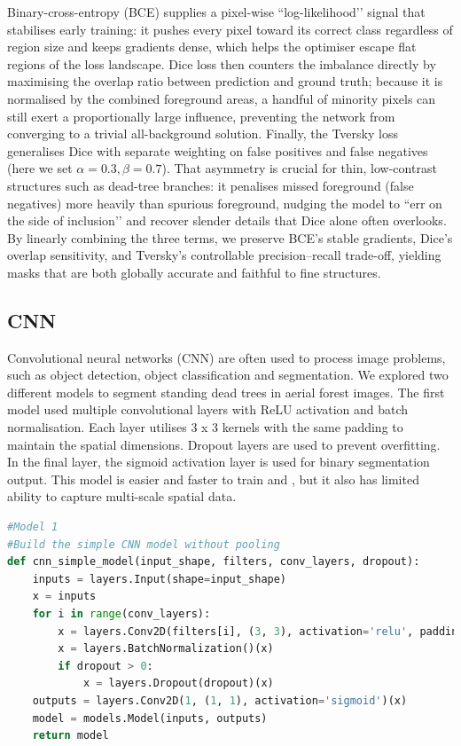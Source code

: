 Binary-cross-entropy (BCE) supplies a pixel-wise “log-likelihood’’ signal that stabilises early training: it pushes every pixel toward its correct class regardless of region size and keeps gradients dense, which helps the optimiser escape flat regions of the loss landscape. Dice loss then counters the imbalance directly by maximising the overlap ratio between prediction and ground truth; because it is normalised by the combined foreground areas, a handful of minority pixels can still exert a proportionally large influence, preventing the network from converging to a trivial all-background solution. Finally, the Tversky loss generalises Dice with separate weighting on false positives and false negatives (here we set \begin{math}\alpha = 0.3, \beta = 0.7\end{math}). That asymmetry is crucial for thin, low-contrast structures such as dead-tree branches: it penalises missed foreground (false negatives) more heavily than spurious foreground, nudging the model to “err on the side of inclusion’’ and recover slender details that Dice alone often overlooks. By linearly combining the three terms, we preserve BCE’s stable gradients, Dice’s overlap sensitivity, and Tversky’s controllable precision–recall trade-off, yielding masks that are both globally accurate and faithful to fine structures.
\subsection{CNN}
Convolutional neural networks (CNN) are often used to process image problems, such as object detection, object classification and segmentation\cite{b8}. We explored two different models to segment standing dead trees in aerial forest images. The first model used multiple convolutional layers with ReLU activation and batch normalisation. Each layer utilises 3 x 3 kernels with the same padding to maintain the spatial dimensions. Dropout layers are used to prevent overfitting. In the final layer, the sigmoid activation layer is used for binary segmentation output. This model is easier and faster to train and , but it also has limited ability to capture multi-scale spatial data. 

\begin{lstlisting}[language=Python]
#Model 1
#Build the simple CNN model without pooling
def cnn_simple_model(input_shape, filters, conv_layers, dropout):
    inputs = layers.Input(shape=input_shape)
    x = inputs
    for i in range(conv_layers):
        x = layers.Conv2D(filters[i], (3, 3), activation='relu', padding='same')(x)
        x = layers.BatchNormalization()(x)
        if dropout > 0:
            x = layers.Dropout(dropout)(x)
    outputs = layers.Conv2D(1, (1, 1), activation='sigmoid')(x)
    model = models.Model(inputs, outputs)
    return model
\end{lstlisting}

